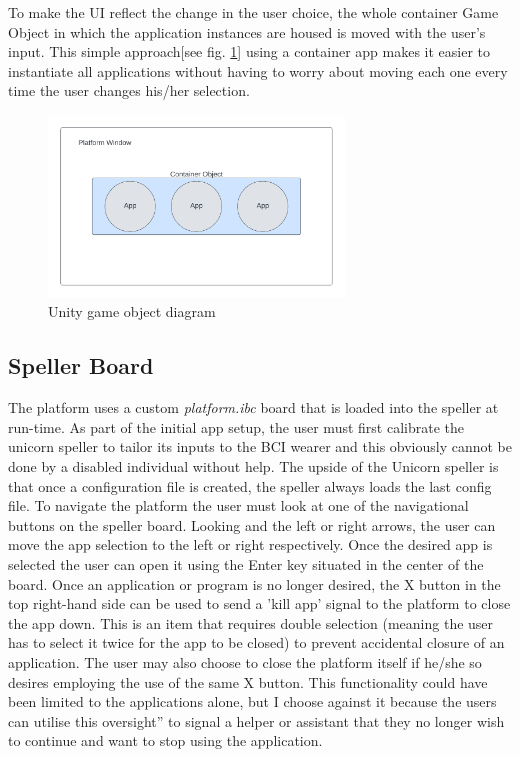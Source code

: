 To make the UI reflect the change in the user choice, the whole container Game Object in which the application instances are housed is moved with the user's input. This simple approach[see fig. \ref{fig:Unity object diagram}] using a container app makes it easier to instantiate all applications without having to worry about moving each one every time the user changes his/her selection.

\begin{figure}[H]
  \centering
  \includegraphics[width=0.7\textwidth]{Diagrams/Unity Objects Diagram.png}
  \caption{Unity game object diagram}
  \label{fig:Unity object diagram}
\end{figure}


\subsection{Speller Board}
 The platform uses a custom \textit{platform.ibc} board that is loaded into the speller at run-time. As part of the initial app setup, the user must first calibrate the unicorn speller to tailor its inputs to the BCI wearer and this obviously cannot be done by a disabled individual without help. The upside of the Unicorn speller is that once a configuration file is created, the speller always loads the last config file.
\vspace{\baselineskip}\newline
To navigate the platform the user must look at one of the navigational buttons on the speller board. Looking and the left or right arrows, the user can move the app selection to the left or right respectively. Once the desired app is selected the user can open it using the Enter key situated in the center of the board. Once an application or program is no longer desired, the X button in the top right-hand side can be used to send a 'kill app' signal to the platform to close the app down. This is an item that requires double selection (meaning the user has to select it twice for the app to be closed) to prevent accidental closure of an application. The user may also choose to close the platform itself if he/she so desires employing the use of the same X button. This functionality could have been limited to the applications alone, but I choose against it because the users can utilise this oversight” to signal a helper or assistant that they no longer wish to continue and want to stop using the application.


